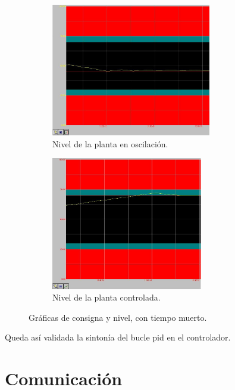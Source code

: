 \begin{figure}[ht]
\centering
  \begin{subfigure}[b]{0.49\textwidth}    
\includegraphics[width=\textwidth, height=5.8cm]
{Cap4-ProgramacionPLC/images/oscpermtd.jpeg}
    \caption{Nivel de la planta en oscilación.}
    \label{fig:oscilacionpermtd}
  \end{subfigure}%
  \hfill
  \begin{subfigure}[b]{0.49\textwidth}
\includegraphics[width=\textwidth,height=5.8cm]
  {Cap4-ProgramacionPLC/images/controladotd.jpeg}
     \caption{Nivel de la planta controlada.}
     \label{fig:controladotd}
  \end{subfigure}
  \caption{Gráficas de consigna y nivel, con tiempo muerto.}
\end{figure}


Queda así validada la sintonía del bucle \gls{pid} en el controlador.

\section{Comunicación}
\label{sec:Comunicacion}

